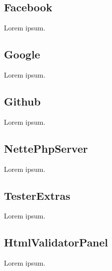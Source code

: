 \tocless\subsection{Facebook}

Lorem ipsum.

\tocless\subsection{Google}

Lorem ipsum.

\tocless\subsection{Github}

Lorem ipsum.

\tocless\subsection{NettePhpServer}

Lorem ipsum.

\tocless\subsection{TesterExtras}

Lorem ipsum.

\tocless\subsection{HtmlValidatorPanel}

Lorem ipsum.
